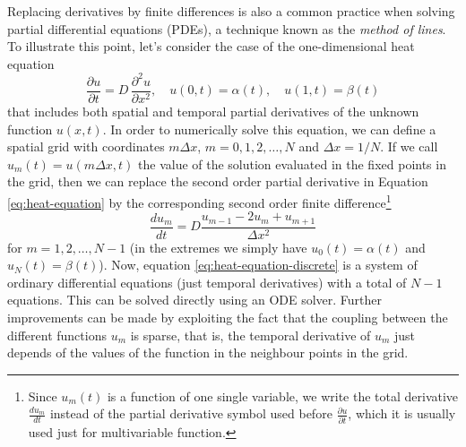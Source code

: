  

Replacing derivatives by finite differences is also a common practice when solving partial differential equations (PDEs), a technique known as the \textit{method of lines}. 
To illustrate this point, let's consider the case of the one-dimensional heat equation
\begin{equation}
 \frac{\partial u}{\partial t}
 = 
 D \, 
 \frac{\partial^2 u}{\partial x^2}, 
 \quad u(0, t) = \alpha(t), 
 \quad u(1, t) = \beta(t)
 \label{eq:heat-equation}
\end{equation}
that includes both spatial and temporal partial derivatives of the unknown function $u(x, t)$.
In order to numerically solve this equation, we can define a spatial grid with coordinates $m \Delta x$, $m=0, 1, 2, \ldots, N$ and $\Delta x = 1 / N$.
If we call $u_m(t) = u(m \Delta x, t)$ the value of the solution evaluated in the fixed points in the grid, then we can replace the second order partial derivative in Equation \eqref{eq:heat-equation} by the corresponding second order finite difference\footnote{Since $u_m(t)$ is a function of one single variable, we write the total derivative $\frac{du_m}{dt}$ instead of the partial derivative symbol used before $\frac{\partial u}{\partial t}$, which it is usually used just for multivariable function.}
\begin{equation}
 \frac{d u_m}{dt} 
 = 
 D 
 \frac{u_{m-1} - 2u_m + u_{m+1}}{\Delta x^2}
 \label{eq:heat-equation-discrete}
\end{equation}
for $m = 1, 2, \ldots, N-1$ (in the extremes we simply have $u_0(t) = \alpha(t)$ and $u_N(t)=\beta(t)$).
Now, equation \eqref{eq:heat-equation-discrete} is a system of ordinary differential equations (just temporal derivatives) with a total of $N-1$ equations.
This can be solved directly using an ODE solver.
Further improvements can be made by exploiting the fact that the coupling between the different functions $u_m$ is sparse, that is, the temporal derivative of $u_m$ just depends of the values of the function in the neighbour points in the grid.

